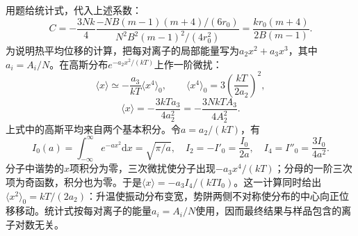 \documentclass[UTF8,fontset=fandol,a4paper,11pt]{ctexart}
\begin{document}
用题给统计式，代入上述系数：
\[
C=-\frac{3Nk}{4}
\frac{-NB(m-1)(m+4)/(6r_0)}
{N^2B^2(m-1)^2/(4r_0^2)}
=\boxed{\frac{k r_0(m+4)}{2B(m-1)}}.
\]
为说明热平均位移的计算，把每对离子的局部能量写为$a_2x^2+a_3x^3$，其中$a_i=A_i/N$。在高斯分布$e^{-a_2x^2/(kT)}$上作一阶微扰：
\[
\langle x\rangle
\simeq-\frac{a_3}{kT}\langle x^4\rangle_0,\qquad
\langle x^4\rangle_0=3\left(\frac{kT}{2a_2}\right)^2,
\]
\[
\langle x\rangle=-\frac{3kTa_3}{4a_2^2}
=-\frac{3NkTA_3}{4A_2^2}.
\]
上式中的高斯平均来自两个基本积分。令$a=a_2/(kT)$，有
\[
I_0(a)=\int_{-\infty}^{\infty}e^{-ax^2}\mathrm dx=\sqrt{\pi/a},\quad
I_2=-I'_0=\frac{I_0}{2a},\quad I_4=I''_0=\frac{3I_0}{4a^2}.
\]
分子中谐势的$x$项积分为零，三次微扰使分子出现$-a_3x^4/(kT)$；分母的一阶三次项为奇函数，积分也为零。于是$\langle x\rangle=-a_3I_4/(kTI_0)$。这一计算同时给出$\langle x^2\rangle_0=kT/(2a_2)$：升温使振动分布变宽，势阱两侧不对称使分布的中心向正位移移动。统计式按每对离子的能量$a_i=A_i/N$使用，因而最终结果与样品包含的离子对数无关。
\end{document}
